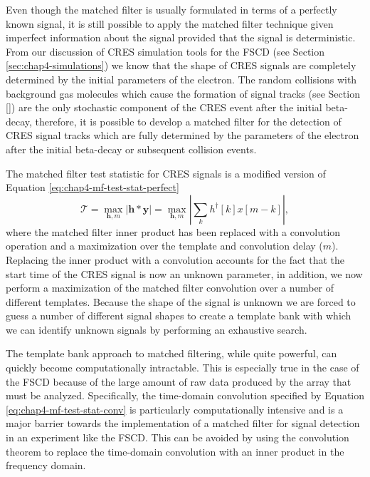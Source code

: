 Even though the matched filter is usually formulated in terms of a perfectly known signal, it is still possible to apply the matched filter technique given imperfect information about the signal provided that the signal is deterministic. From our discussion of CRES simulation tools for the FSCD (see Section \ref{sec:chap4-simulations}) we know that the shape of CRES signals are completely determined by the initial parameters of the electron. The random collisions with background gas molecules which cause the formation of signal tracks (see Section \ref{}) are the only stochastic component of the CRES event after the initial beta-decay, therefore, it is possible to develop a matched filter for the detection of CRES signal tracks which are fully determined by the parameters of the electron after the initial beta-decay or subsequent collision events.

The matched filter test statistic for CRES signals is a modified version of Equation \ref{eq:chap4-mf-test-stat-perfect}
\begin{equation}
    \mathcal{T} = \max_{\bm{h},m}\left|\bm{h}\ast\bm{y}\right|=\max_{\bm{h},m}\left|\sum_{k}h^\dagger[k]x[m-k]\right|,
    \label{eq:chap4-mf-test-stat-conv}
\end{equation}
where the matched filter inner product has been replaced with a convolution operation and a maximization over the template and convolution delay ($m$). Replacing the inner product with a convolution accounts for the fact that the start time of the CRES signal is now an unknown parameter, in addition, we now perform a maximization of the matched filter convolution over a number of different templates. Because the shape of the signal is unknown we are forced to guess a number of different signal shapes to create a template bank with which we can identify unknown signals by performing an exhaustive search.

The template bank approach to matched filtering, while quite powerful, can quickly become computationally intractable. This is especially true in the case of the FSCD because of the large amount of raw data produced by the array that must be analyzed. Specifically, the time-domain convolution specified by Equation \ref{eq:chap4-mf-test-stat-conv} is particularly computationally intensive and is a major barrier towards the implementation of a matched filter for signal detection in an experiment like the FSCD. This can be avoided by using the convolution theorem to replace the time-domain convolution with an inner product in the frequency domain. 

